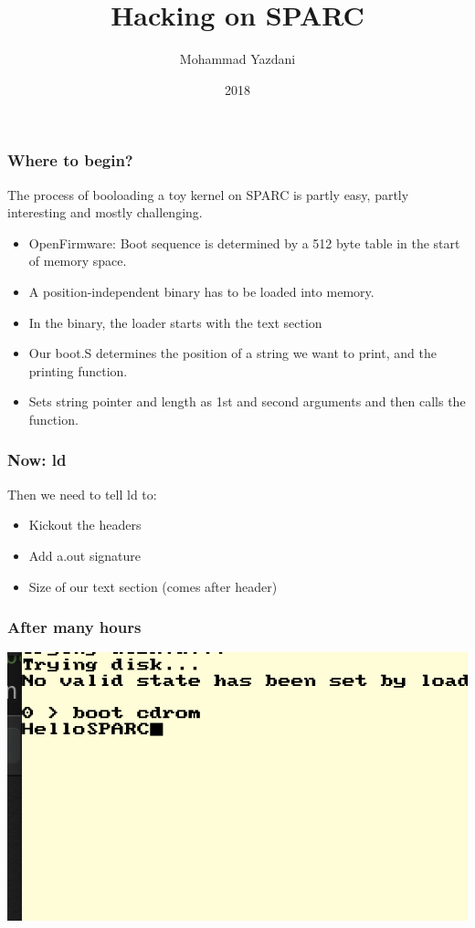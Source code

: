 \documentclass{beamer}
\title{Hacking on SPARC}
\author{Mohammad Yazdani}
\institute{CS 850}
\date{2018}
\begin{document}
 
\frame{\titlepage}
 
\begin{frame}
\frametitle{Where to begin?}
The process of booloading a toy kernel on SPARC is partly easy, partly interesting and mostly challenging.
\begin{itemize}
    \item OpenFirmware: Boot sequence is determined by a 512 byte table in the start of memory space.
    \item A position-independent binary has to be loaded into memory.
    \item In the binary, the loader starts with the text section
    \item Our boot.S determines the position of a string we want to print, and the printing function.
    \item Sets string pointer and length as 1st and second arguments and then calls the function.
\end{itemize}
\end{frame}

\begin{frame}
    \frametitle{Now: ld}
    Then we need to tell ld to:
    \begin{itemize}
        \item Kickout the headers
        \item Add a.out signature
        \item Size of our text section (comes after header)
    \end{itemize}
\end{frame}

\begin{frame}
    \frametitle{After many hours}
    \includegraphics{sshot.png}
\end{frame}
\end{document}
